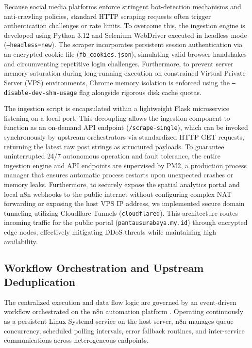 \documentclass[conference]{IEEEtran}
\begin{document}
Because social media platforms enforce stringent bot-detection mechanisms and anti-crawling policies, standard HTTP scraping requests often trigger authentication challenges or rate limits. To overcome this, the ingestion engine is developed using Python 3.12 and Selenium WebDriver executed in headless mode (\texttt{--headless=new}). The scraper incorporates persistent session authentication via an encrypted cookie file (\texttt{fb\_cookies.json}), simulating valid browser handshakes and circumventing repetitive login challenges. Furthermore, to prevent server memory saturation during long-running execution on constrained Virtual Private Server (VPS) environments, Chrome memory isolation is enforced using the \texttt{--disable-dev-shm-usage} flag alongside rigorous disk cache quotas.

The ingestion script is encapsulated within a lightweight Flask microservice listening on a local port. This decoupling allows the ingestion component to function as an on-demand API endpoint (\texttt{/scrape-single}), which can be invoked synchronously by upstream orchestrators via standardized HTTP GET requests, returning the latest raw post strings as structured payloads. To guarantee uninterrupted 24/7 autonomous operation and fault tolerance, the entire ingestion engine and API endpoints are supervised by PM2, a production process manager that ensures automatic process restarts upon unexpected crashes or memory leaks. Furthermore, to securely expose the spatial analytics portal and local n8n webhooks to the public internet without configuring complex NAT forwarding or exposing the host VPS IP address, we implemented secure domain tunneling utilizing Cloudflare Tunnels (\texttt{cloudflared}). This architecture routes incoming traffic for the public portal (\texttt{pantausurabaya.my.id}) through encrypted edge nodes, effectively mitigating DDoS threats while maintaining high availability.

\subsection{Workflow Orchestration and Upstream Deduplication}

The centralized execution and data flow logic are governed by an event-driven workflow orchestrated on the n8n automation platform \cite{n8n2024docs}. Operating continuously as a persistent Linux Systemd service on the host server, n8n manages queue concurrency, scheduled polling intervals, error fallback routines, and inter-service communications across heterogeneous endpoints.
\end{document}
